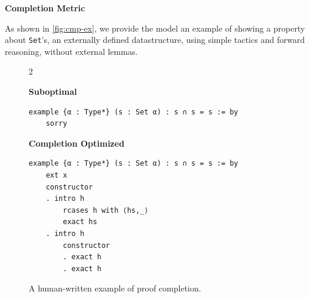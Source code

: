 \textbf{Completion Metric}


As shown in \autoref{fig:cmp-ex}, we provide the model an example of showing a property about \texttt{Set}'s, an externally defined datastructure, using simple tactics and forward reasoning, without external lemmas.
\setlength{\columnsep}{0.2cm}
\begin{figure}[ht]
\begin{multicols}{2}

{
\textbf{Suboptimal}
\begin{scriptsize}
\begin{lstlisting}[basicstyle=\scriptsize\ttfamily]
example {α : Type*} (s : Set α) : s ∩ s = s := by
    sorry
\end{lstlisting}
\end{scriptsize}
}
\vfill\null
\columnbreak
{
\textbf{Completion Optimized}
\begin{scriptsize}
\begin{lstlisting}[basicstyle=\scriptsize\ttfamily]
example {α : Type*} (s : Set α) : s ∩ s = s := by
    ext x
    constructor
    . intro h
        rcases h with ⟨hs,_⟩
        exact hs
    . intro h
        constructor
        . exact h
        . exact h
\end{lstlisting}
\end{scriptsize}
}
\end{multicols}
\vspace{-2.5em}
\caption{A human-written example of proof completion.}
\label{fig:cmp-ex}
\end{figure}




